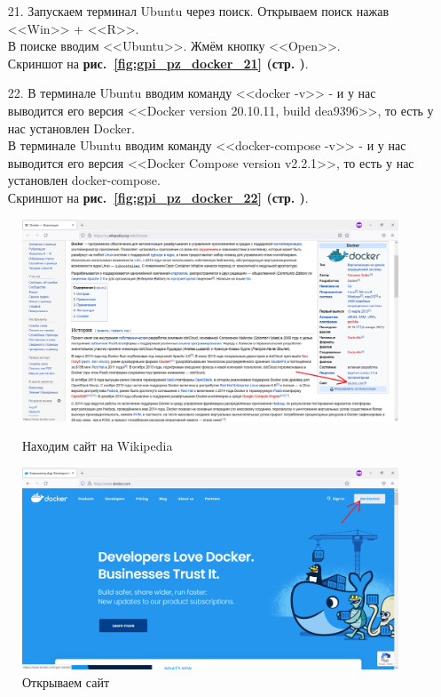 \begin{itemize}
    \item[21.] Запускаем терминал Ubuntu через поиск. Открываем поиск нажав <<Win>> + <<R>>. \\
    В поиске вводим <<Ubuntu>>. Жмём кнопку <<Open>>. \\
    Скриншот на \textbf{рис.~\ref{fig:gpi_pz_docker_21} (стр. \pageref{fig:gpi_pz_docker_21})}.

    \item[22.] В терминале Ubuntu вводим команду <<docker -v>> - и у нас выводится его версия <<Docker version 20.10.11, build dea9396>>,
    то есть у нас установлен Docker. \\
    В терминале Ubuntu вводим команду <<docker-compose -v>> - и у нас выводится его версия <<Docker Compose version v2.2.1>>,
    то есть у нас установлен docker-compose. \\
    Скриншот на \textbf{рис.~\ref{fig:gpi_pz_docker_22} (стр. \pageref{fig:gpi_pz_docker_22})}.

\end{itemize}

\begin{figure}[!p]
    \centering
    \begin{minipage}{0.47\textwidth}
        \centering
        \includegraphics[width=\linewidth]
            {_assets/gpi_pz_docker_01.png}
        \caption{Находим сайт на Wikipedia}
        \label{fig:gpi_pz_docker_01}
    \end{minipage}
    \begin{minipage}{0.47\textwidth}
        \centering
        \includegraphics[width=\linewidth]
            {_assets/gpi_pz_docker_02.png}
        \caption{Открываем сайт}
        \label{fig:gpi_pz_docker_02}
    \end{minipage}
\end{figure}

